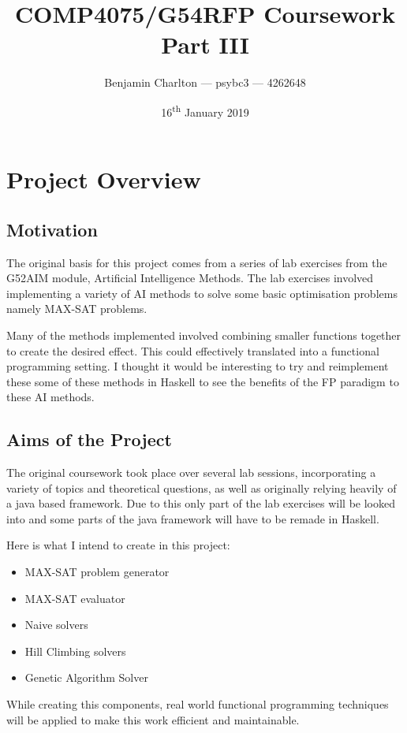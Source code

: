 \documentclass[a4paper]{article}
\title{COMP4075/G54RFP Coursework Part III}
\date{16\textsuperscript{th} January 2019}
\author{Benjamin Charlton --- psybc3 --- 4262648}
\begin{document}

\maketitle

\section{Project Overview}
\subsection{Motivation}
The original basis for this project comes from a series of lab exercises from the G52AIM module, Artificial Intelligence Methods.
The lab exercises involved implementing a variety of AI methods to solve some basic optimisation problems namely MAX-SAT problems.
\par
Many of the methods implemented involved combining smaller functions together to create the desired effect.
This could effectively translated into a functional programming setting.
I thought it would be interesting to try and reimplement these some of these methods in Haskell to see the benefits of the FP paradigm to these AI methods.

\subsection{Aims of the Project}
The original coursework took place over several lab sessions, incorporating a variety of topics and theoretical questions, as well as originally relying heavily of a java based framework.
Due to this only part of the lab exercises will be looked into and some parts of the java framework will have to be remade in Haskell.
\par
Here is what I intend to create in this project:\vspace*{-4mm}
\begin{multicols}{3}
    \begin{itemize}[noitemsep,nolistsep]
        \item MAX-SAT problem generator
        \item MAX-SAT evaluator
        \item Naive solvers
        \item Hill Climbing solvers
        \item Genetic Algorithm Solver
    \end{itemize}
\end{multicols}\vspace*{-3mm}
While creating this components, real world functional programming techniques will be applied to make this work efficient and maintainable.
\end{document}
